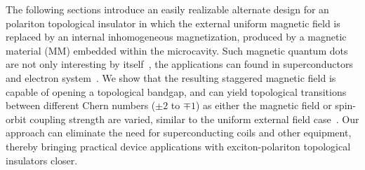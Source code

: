 The following sections introduce an easily realizable alternate design for an polariton topological insulator in which the external uniform magnetic field is replaced by an internal inhomogeneous magnetization, produced by a magnetic material (MM) embedded within the microcavity.
Such magnetic quantum dots are not only interesting by itself~\cite{Vavassori:2000aa}, the applications can found in superconductors~\cite{Erdin:2002aa,Otani:1993aa,Lyuskyutov:2005aa} and electron system~\cite{Li:2007aa}.
We show that the resulting staggered magnetic field is capable of opening a topological bandgap, and can yield topological transitions between different Chern numbers ($\pm 2$ to $\mp 1$) as either the magnetic field or spin-orbit coupling strength are varied, similar to the uniform external field case~\cite{Bleu:2017aa}.
Our approach can eliminate the need for superconducting coils and other equipment, thereby bringing practical device applications with exciton-polariton topological insulators closer.




